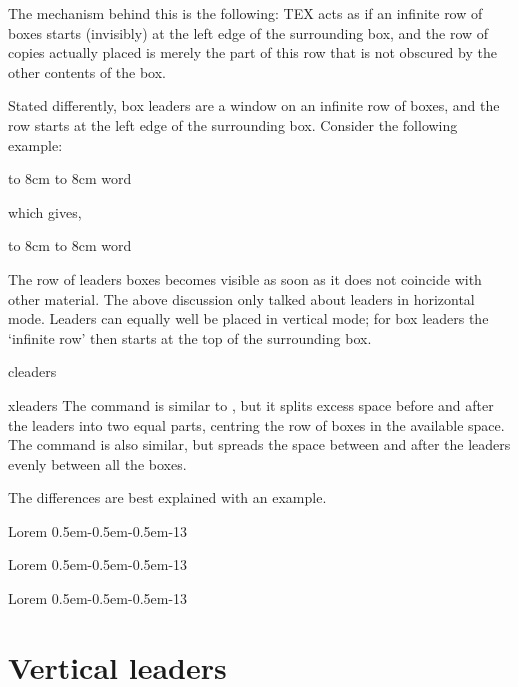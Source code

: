 The mechanism behind this is the following: TEX acts as if an infinite row of boxes starts (invisibly)
at the left edge of the surrounding box, and the row of copies actually placed is merely the part of
this row that is not obscured by the other contents of the box.

Stated differently, box leaders are a window on an infinite row of boxes, and the row starts at the
left edge of the surrounding box. Consider the following example:

\begin{texexample}{}{}
\hbox to 8cm {\leaders\copy\centerdot\hfil}
\hbox to 8cm {word\leaders\copy\centerdot\hfil}
\end{texexample}

which gives,

\hbox to 8cm {\leaders\copy\centerdot\hfil}
\hbox to 8cm {word\leaders\copy\centerdot\hfil}

The row of leaders boxes becomes visible as soon as it does not coincide with other material.
The above discussion only talked about leaders in horizontal mode. Leaders can equally well be
placed in vertical mode; for box leaders the ‘infinite row’ then starts at the top of the surrounding
box.


\begin{macro}{cleaders}
\begin{macro}{xleaders}
The  command is similar to 
, but it splits excess space before and after the leaders into two equal parts, centring the row of boxes in the available space.
The  command is also similar, but spreads the space between and after the leaders evenly between all the boxes.
\end{macro}
\end{macro}

The differences are best explained with an example.

\begin{texexample}{}{}
\def\leaderpattern{\hbox{\kern0.5em-\kern0.5em-\kern0.5em-}}
Lorem \leaders\leaderpattern\hfill 13\par
Lorem \cleaders\leaderpattern\hfill 13\par
Lorem \xleaders\leaderpattern\hfill 13\par
\end{texexample}


\section{Vertical leaders}

